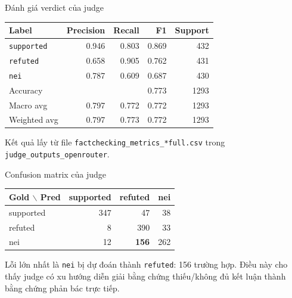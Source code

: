 \documentclass[aspectratio=169]{beamer}
\begin{document}
\begin{frame}{Đánh giá verdict của judge}
  \begin{table}
    \centering
    \small
    \begin{tabular}{lrrrr}
      \toprule
      Label & Precision & Recall & F1 & Support \\
      \midrule
      \texttt{supported} & 0.946 & 0.803 & 0.869 & 432 \\
      \texttt{refuted} & 0.658 & 0.905 & 0.762 & 431 \\
      \texttt{nei} & 0.787 & 0.609 & 0.687 & 430 \\
      \midrule
      Accuracy & & & 0.773 & 1293 \\
      Macro avg & 0.797 & 0.772 & 0.772 & 1293 \\
      Weighted avg & 0.797 & 0.773 & 0.772 & 1293 \\
      \bottomrule
    \end{tabular}
  \end{table}

  \vspace{0.1cm}
  \footnotesize
  Kết quả lấy từ file \texttt{factchecking\_metrics\_*full.csv} trong \texttt{judge\_outputs\_openrouter}.
\end{frame}

\begin{frame}{Confusion matrix của judge}
  \begin{table}
    \centering
    \small
    \begin{tabular}{lrrr}
      \toprule
      Gold $\backslash$ Pred & supported & refuted & nei \\
      \midrule
      supported & 347 & 47 & 38 \\
      refuted & 8 & 390 & 33 \\
      nei & 12 & \textbf{156} & 262 \\
      \bottomrule
    \end{tabular}
  \end{table}

  \vspace{0.15cm}
  \footnotesize
  Lỗi lớn nhất là \texttt{nei} bị dự đoán thành \texttt{refuted}: 156 trường hợp. Điều này cho thấy judge có xu hướng diễn giải bằng chứng thiếu/không đủ kết luận thành bằng chứng phản bác trực tiếp.
\end{frame}
\end{document}
